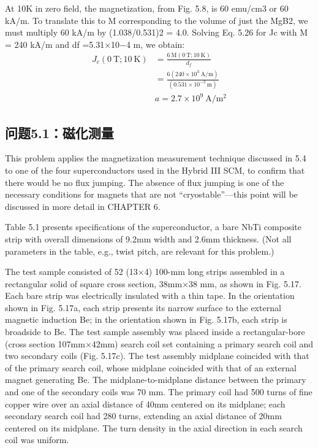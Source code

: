 At 10K in zero field, the magnetization, from Fig. 5.8, is 60 emu/cm3 or 60 kA/m.
To translate this to M corresponding to the volume of just the MgB2, we must
multiply 60 kA/m by (1.038/0.531)2 = 4.0. Solving Eq. 5.26 for Jc with M =
240 kA/m and df =5.31×10−4 m, we obtain:
\begin{align*}%
J_{c}(0\ \mathrm{T};10\ \mathrm{K})&=\frac{6\ \mathrm{M}(0\ \mathrm{T};10\ \mathrm{K})}{d_{f}}\\
&=\frac{6(240\times10^{3}\ \mathrm{A/m})}{(0.531\times10^{-3}\ \mathrm{m})}\\
&a=2.7\times10^{9}\ \mathrm{A/m^{2}}
\end{align*}


\subsection{问题5.1：磁化测量}
This problem applies the magnetization measurement technique discussed in 5.4 to
one of the four superconductors used in the Hybrid III SCM, to confirm that there
would be no flux jumping. The absence of flux jumping is one of the necessary
conditions for magnets that are not “cryostable”—this point will be discussed in
more detail in CHAPTER 6.

Table 5.1 presents specifications of the superconductor, a bare NbTi composite
strip with overall dimensions of 9.2mm width and 2.6mm thickness. (Not all
parameters in the table, e.g., twist pitch, are relevant for this problem.)

The test sample consisted of 52 (13×4) 100-mm long strips assembled in a rectangular
solid of square cross section, 38mm×38 mm, as shown in Fig. 5.17. Each
bare strip was electrically insulated with a thin tape. In the orientation shown
in Fig. 5.17a, each strip presents its narrow surface to the external magnetic induction
Be; in the orientation shown in Fig. 5.17b, each strip is broadside to
Be. The test sample assembly was placed inside a rectangular-bore (cross section
107mm×42mm) search coil set containing a primary search coil and two secondary
coils (Fig. 5.17c). The test assembly midplane coincided with that of the primary
search coil, whose midplane coincided with that of an external magnet generating
Be. The midplane-to-midplane distance between the primary and one of the
secondary coils was 70 mm. The primary coil had 500 turns of fine copper wire
over an axial distance of 40mm centered on its midplane; each secondary search
coil had 280 turns, extending an axial distance of 20mm centered on its midplane.
The turn density in the axial direction in each search coil was uniform.

